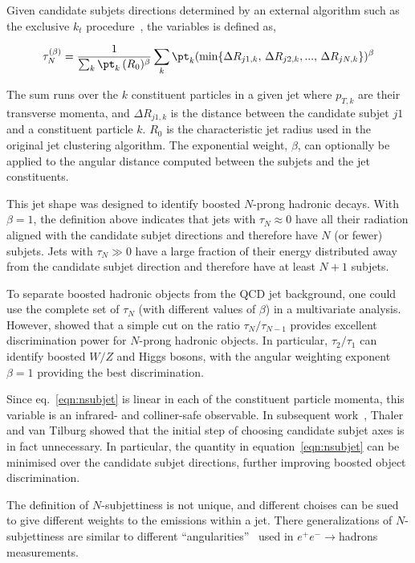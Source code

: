 Given candidate subjets directions determined by an external algorithm such as the exclusive $k_t$ procedure~\cite{exclusivekt}, the variables is defined as,


\begin{equation} 
\tau^{(\beta)}_N = \frac{1}{\sum_k {\pt}_k\,(R_0)^{\beta}} \sum_k {\pt}_k (\min \{ \Delta R_{j1,k},\,\Delta R_{j2,k},...,\,\Delta R_{jN,k} \})^{\beta}
\label{eqn:nsubjet}
\end{equation} 

The sum runs over the $k$ constituent particles in a given jet where $p_{T,k}$ are their transverse momenta, and $\Delta R_{j1,k}$ is the distance between the candidate subjet $j1$ and a constituent particle $k$.  $R_0$ is the characteristic jet radius used in the original jet clustering algorithm.
The exponential weight, $\beta$, can optionally be applied to the angular distance computed between the subjets and the jet constituents.  

This jet shape was designed to identify boosted $N$-prong hadronic decays. With $\beta=1$, the definition above indicates that jets with $\tau_N\approx 0$ have all their radiation aligned with the candidate subjet directions and therefore have $N$ (or fewer) subjets. Jets with $\tau_N\gg 0$ have a large fraction of their energy distributed away from the candidate subjet direction and therefore have at least $N+1$ subjets.

To separate boosted hadronic objects from the QCD jet background, one could use the complete set of  $\tau_N$ (with different values of $\beta$) in a multivariate analysis. However, \cite{nsubjettiness} showed that a simple cut on the ratio $\tau_N/\tau_{N-1}$ provides excellent discrimination power for $N$-prong hadronic objects. In particular, $\tau_2/\tau_1$ can identify boosted $W/Z$ and Higgs bosons, with the angular weighting exponent $\beta =1$ providing the best discrimination.

Since eq.~\ref{eqn:nsubjet} is linear in each of the constituent particle momenta, this variable is an infrared- and colliner-safe observable.  In subsequent work~\cite{mininsubjettiness}, Thaler and van Tilburg showed that the initial step of choosing candidate subjet axes is in fact unnecessary. In particular, the quantity in equation~\ref{eqn:nsubjet} can be minimised over the candidate subjet directions, further improving boosted object discrimination.

The definition of $N$-subjettiness is not unique, and different choises can be sued to give different weights to the emissions within a jet. There generalizations of $N$-subjettiness are similar to different ``angularities''~\cite{angularities} used in $e^+e^- \rightarrow$hadrons measurements.


